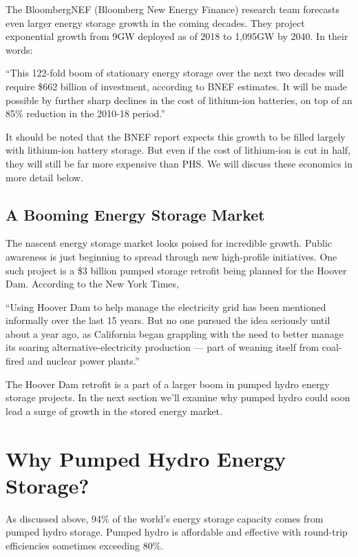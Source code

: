 \documentclass[hidelinks,12pt,a4paper]{article}
\begin{document}
The BloombergNEF (Bloomberg New Energy Finance) research team forecasts even larger energy storage growth in the coming decades. They project exponential growth from 9GW deployed as of 2018 to 1,095GW by 2040. In their words:

\begin{displayquote}
“This 122-fold boom of stationary energy storage over the next two decades will require \$662 billion of investment, according to BNEF estimates. It will be made possible by further sharp declines in the cost of lithium-ion batteries, on top of an 85\% reduction in the 2010-18 period.” \cite{EnergyStorageInvestmentsBoom}
\end{displayquote}

It should be noted that the BNEF report expects this growth to be filled largely with lithium-ion battery storage. But even if the cost of lithium-ion is cut in half, they will still be far more expensive than PHS. We will discuss these economics in more detail below.


\subsection{A Booming Energy Storage Market}
The nascent energy storage market looks poised for incredible growth. Public awareness is just beginning to spread through new high-profile initiatives. One such project is a \$3 billion pumped storage retrofit being planned for the Hoover Dam. According to the New York Times,

\begin{displayquote}
“Using Hoover Dam to help manage the electricity grid has been mentioned informally over the last 15 years. But no one pursued the idea seriously until about a year ago, as California began grappling with the need to better manage its soaring alternative-electricity production — part of weaning itself from coal-fired and nuclear power plants.” \cite{The3BillionPlanToTurnHooverDamIntoAGiantBattery}
\end{displayquote}

The Hoover Dam retrofit is a part of a larger boom in pumped hydro energy storage projects. In the next section we'll examine why pumped hydro could soon lead a surge of growth in the stored energy market.

\pagebreak[4]
\section{Why Pumped Hydro Energy Storage?}
As discussed above, 94\% of the world's energy storage capacity comes from pumped hydro storage. \cite{ElectricStorageCapacityInTheUnitedStates} Pumped hydro is affordable and effective with round-trip efficiencies sometimes exceeding 80\%. \cite{ESAPumpedHydroelectricStorage}
\end{document}
